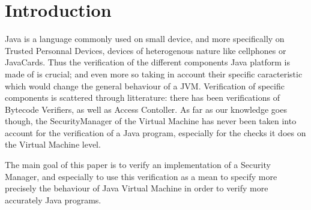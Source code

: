 \documentclass[draft]{llncs}
\begin{document}
\section{Introduction}
Java is a language commonly used on small device, and more specifically on Trusted Personnal Devices, devices
of heterogenous nature like cellphones or JavaCards. Thus the verification of the different components Java
platform is made of is crucial; and even more so taking in account their specific caracteristic which would
change the general behaviour of a JVM. Verification of specific components is scattered through litterature: 
there has been verifications of Bytecode Verifiers, as well as Access Contoller. As far as our knowledge goes
though, the SecurityManager of the Virtual Machine has never been taken into account for
the verification of a Java program, especially for the checks it does on the Virtual Machine level.

The main goal of this paper is to verify an implementation of a Security Manager, and especially to use 
this verification as a mean to specify more precisely the behaviour of Java Virtual Machine in order to
verify more accurately Java programs.
\end{document}
